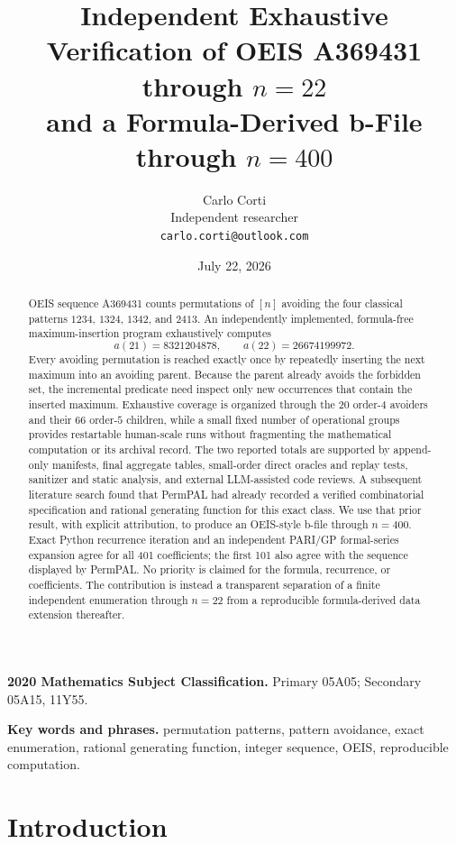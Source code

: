 \documentclass[11pt]{article}
\title{Independent Exhaustive Verification of OEIS A369431 through $n=22$\\
and a Formula-Derived b-File through $n=400$}
\author{Carlo Corti\\
Independent researcher\\
\texttt{carlo.corti@outlook.com}}
\date{July 22, 2026}
\theoremstyle{definition}
\theoremstyle{remark}
\begin{document}
\maketitle

\begin{abstract}
OEIS sequence A369431 counts permutations of $[n]$ avoiding the four
classical patterns $1234$, $1324$, $1342$, and $2413$.  An independently
implemented, formula-free maximum-insertion program exhaustively computes
\[
 a(21)=8321204878,
 \qquad
 a(22)=26674199972.
\]
Every avoiding permutation is reached exactly once by repeatedly inserting
the next maximum into an avoiding parent.  Because the parent already avoids
the forbidden set, the incremental predicate need inspect only new occurrences that
contain the inserted maximum.  Exhaustive coverage is organized through the
20 order-$4$ avoiders and their 66 order-$5$ children, while a small fixed
number of operational groups provides restartable human-scale runs without
fragmenting the mathematical computation or its archival record.  The two
reported totals are supported by append-only manifests, final aggregate
tables, small-order direct oracles and replay tests, sanitizer and static
analysis, and external LLM-assisted code reviews.  A subsequent literature
search found that PermPAL had already recorded a verified combinatorial
specification and rational generating function for this exact class.  We use
that prior result, with explicit attribution, to produce an OEIS-style b-file
through $n=400$.  Exact Python recurrence iteration and an independent
PARI/GP formal-series expansion agree for all 401 coefficients; the first
101 also agree with the sequence displayed by PermPAL.  No priority is claimed
for the formula, recurrence, or coefficients.  The contribution is instead a
transparent separation of a finite independent enumeration through $n=22$
from a reproducible formula-derived data extension thereafter.
\end{abstract}

\noindent\textbf{2020 Mathematics Subject Classification.}
Primary 05A05; Secondary 05A15, 11Y55.

\noindent\textbf{Key words and phrases.}
permutation patterns, pattern avoidance, exact enumeration, rational
generating function, integer sequence, OEIS, reproducible computation.

\section{Introduction}
\label{sec:introduction}
\end{document}
